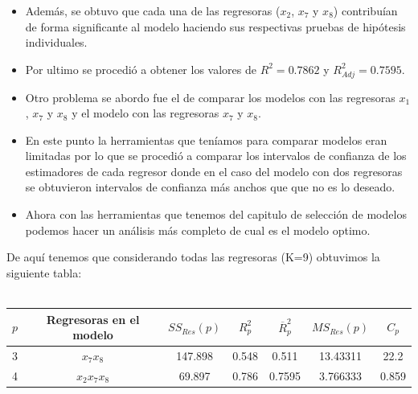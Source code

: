 \documentclass[11pt]{beamer}
\begin{document}
\begin{frame}
\begin{itemize}
\justifying
\item[\textcolor{red}{\textbullet}] Además, se obtuvo que cada una de las regresoras ($x_{2}$, $x_{7}$ y $x_{8}$) contribuían de forma significante al modelo haciendo sus respectivas pruebas de hipótesis individuales.

\item[\textcolor{red}{\textbullet}] Por ultimo se procedió a obtener los valores de $R^{2}=0.7862$ y $R^{2}_{Adj}=0.7595$.
\end{itemize}
\end{frame}

\begin{frame}

\begin{itemize}
\justifying

\item[\textcolor{red}{\textbullet}] Otro problema se abordo fue el de comparar los modelos con las regresoras $x_{1}$, $x_{7}$ y $x_{8}$ y el modelo con las regresoras $x_{7}$ y $x_{8}$.

\item[\textcolor{red}{\textbullet}] En este punto la herramientas que teníamos para comparar modelos eran limitadas por lo que se procedió a comparar los intervalos de confianza de los estimadores de cada regresor donde en el caso del modelo con dos regresoras se obtuvieron intervalos de confianza más anchos que que no es lo deseado.

\item[\textcolor{red}{\textbullet}] Ahora con las herramientas que tenemos del capitulo de selección de modelos podemos hacer un análisis más completo de cual es el modelo optimo.

\end{itemize}
\end{frame}

\begin{frame}

De aquí tenemos que considerando todas las regresoras (K=9) obtuvimos la siguiente tabla:\\~\\

\begin{adjustbox}{width=1\textwidth}
\begin{tabular}{ccccccc}
\hline 
$p$ & Regresoras en el modelo & $SS_{Res}(p)$ & $R_{p}^{2}$ & $\overline{R}_{p}^{2}$ & $MS_{Res}(p)$ & $C_{p}$ \\ 
\hline 
3 & $x_{7}x_{8}$ & 147.898 & 0.548 & 0.511 & 13.43311 & 22.2 \\ 
4 & $x_{2}x_{7}x_{8}$ & 69.897 & 0.786  & 0.7595 & 3.766333 & 0.859 \\ 
\hline 
\end{tabular} 
\end{adjustbox}

\end{frame}
\end{document}
